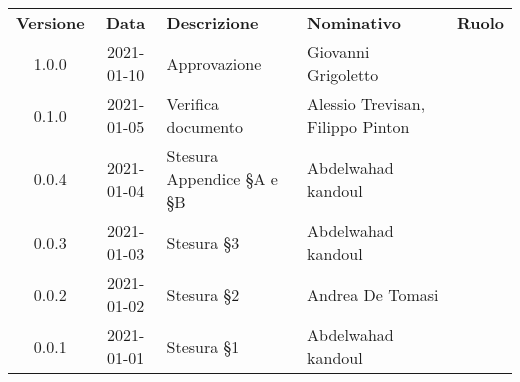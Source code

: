{
    \renewcommand{\arraystretch}{1.5}
    \centering
    \begin{longtable}{ c c  C{3.5cm}  C{4cm}  c }
        \rowcolor{\primaryColor}
        \textcolor{\secondaryColor}{
        \textbf{Versione}}     & \textcolor{\secondaryColor}{\textbf{Data}}       & \textcolor{\secondaryColor}
        {\textbf{Descrizione}} & \textcolor{\secondaryColor}{\textbf{Nominativo}} & \textcolor{\secondaryColor}{\textbf{Ruolo}}                          \\


        1.0.0                   &2021-01-10                                        & Approvazione                                   &Giovanni Grigoletto & \responsabile{}\\
        0.1.0                  & 2021-01-05                                       & Verifica documento                            & Alessio Trevisan, Filippo Pinton & \verificatore{}\\
        0.0.4                  & 2021-01-04                                       & Stesura Appendice §A e §B                          & Abdelwahad kandoul & \verificatore{} \\
        0.0.3                  & 2021-01-03                                       & Stesura §3                            & Abdelwahad kandoul & \verificatore{} \\
        0.0.2                  & 2021-01-02                                       & Stesura §2                              & Andrea De Tomasi & \verificatore{} \\
        0.0.1                  & 2021-01-01                                       & Stesura §1                            & Abdelwahad kandoul & \verificatore{} \\
    
    
    \end{longtable}
}